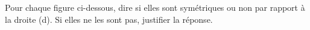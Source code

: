 \documentclass[exercice]{thedocument}%
\begin{document}
%
Pour chaque figure ci-dessous, dire si elles sont symétriques ou non par
rapport à la droite (d). Si elles ne les sont pas, justifier la réponse.
\par\noindent
\end{document}

